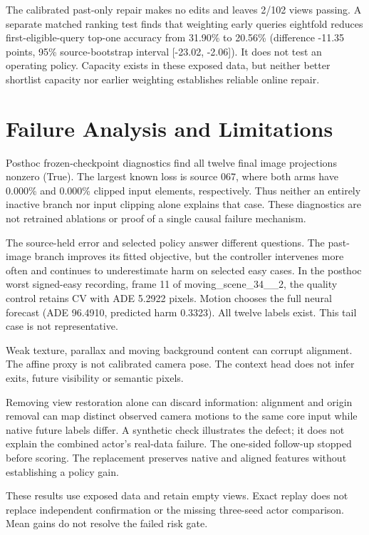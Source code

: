 \documentclass[10pt,twocolumn,letterpaper]{article}
\begin{document}
The calibrated past-only repair makes no edits and leaves 2/102 views passing. A separate matched ranking test finds that weighting early queries eightfold reduces first-eligible-query top-one accuracy from 31.90\% to 20.56\% (difference -11.35 points, 95\% source-bootstrap interval [-23.02, -2.06]). It does not test an operating policy. Capacity exists in these exposed data, but neither better shortlist capacity nor earlier weighting establishes reliable online repair.


\section{Failure Analysis and Limitations}

Posthoc frozen-checkpoint diagnostics find all twelve final image projections nonzero (True). The largest known loss is source 067, where both arms have 0.000\% and 0.000\% clipped input elements, respectively. Thus neither an entirely inactive branch nor input clipping alone explains that case. These diagnostics are not retrained ablations or proof of a single causal failure mechanism.


The source-held error and selected policy answer different questions. The past-image branch improves its fitted objective, but the controller intervenes more often and continues to underestimate harm on selected easy cases. In the posthoc worst signed-easy recording, frame 11 of moving\_scene\_34\_\_2, the quality control retains CV with ADE 5.2922 pixels. Motion chooses the full neural forecast (ADE 96.4910, predicted harm 0.3323). All twelve labels exist. This tail case is not representative.


Weak texture, parallax and moving background content can corrupt alignment. The affine proxy is not calibrated camera pose. The context head does not infer exits, future visibility or semantic pixels.


Removing view restoration alone can discard information: alignment and origin removal can map distinct observed camera motions to the same core input while native future labels differ. A synthetic check illustrates the defect; it does not explain the combined actor's real-data failure. The one-sided follow-up stopped before scoring. The replacement preserves native and aligned features without establishing a policy gain.


These results use exposed data and retain empty views. Exact replay does not replace independent confirmation or the missing three-seed actor comparison. Mean gains do not resolve the failed risk gate.
\end{document}
